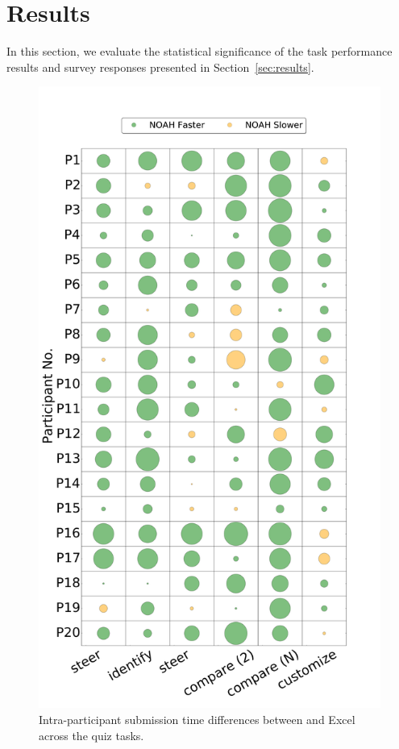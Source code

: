 \section*{Results}
In this section, we evaluate the statistical significance of the task performance results and survey responses presented in Section~\ref{sec:results}. 
\begin{figure}
    \centering
    \includegraphics[trim=0 57 0 145,clip,width=\linewidth]{images/userinfo-ip-1.pdf}
   \caption{Intra-participant submission time differences between \noah and Excel across the quiz tasks.}
   \label{fig:ipdiff}
 \end{figure}

